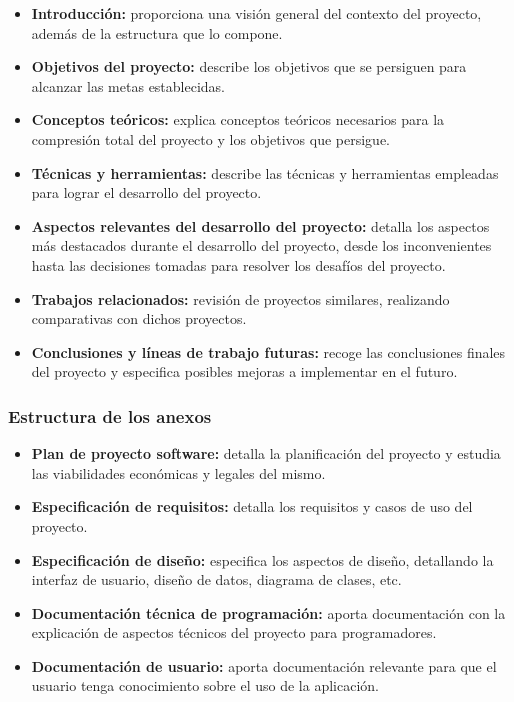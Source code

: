 \begin{itemize}
    \item \textbf{Introducción:} proporciona una visión general del contexto del proyecto, además de la estructura que lo compone.
    \item \textbf{Objetivos del proyecto:} describe los objetivos que se persiguen para alcanzar las metas establecidas.
    \item \textbf{Conceptos teóricos:} explica conceptos teóricos necesarios para la compresión total del proyecto y los objetivos que persigue.
    \item \textbf{Técnicas y herramientas:} describe las técnicas y herramientas empleadas para lograr el desarrollo del proyecto.
    \item \textbf{Aspectos relevantes del desarrollo del proyecto:} detalla los aspectos más destacados durante el desarrollo del proyecto, desde los inconvenientes hasta las decisiones tomadas para resolver los desafíos del proyecto.
    \item \textbf{Trabajos relacionados:} revisión de proyectos similares, realizando comparativas con dichos proyectos.
    \item \textbf{Conclusiones y líneas de trabajo futuras:} recoge las conclusiones finales del proyecto y especifica posibles mejoras a implementar en el futuro.
\end{itemize}

\subsubsection{Estructura de los anexos}

\begin{itemize}
    \item \textbf{Plan de proyecto software:} detalla la planificación del proyecto y estudia las viabilidades económicas y legales del mismo.
    \item \textbf{Especificación de requisitos:} detalla los requisitos y casos de uso del proyecto.
    \item \textbf{Especificación de diseño:} especifica los aspectos de diseño, detallando la interfaz de usuario, diseño de datos, diagrama de clases, etc.
    \item \textbf{Documentación técnica de programación:} aporta documentación con la explicación de aspectos técnicos del proyecto para programadores.
    \item \textbf{Documentación de usuario:} aporta documentación relevante para que el usuario tenga conocimiento sobre el uso de la aplicación.
\end{itemize}
